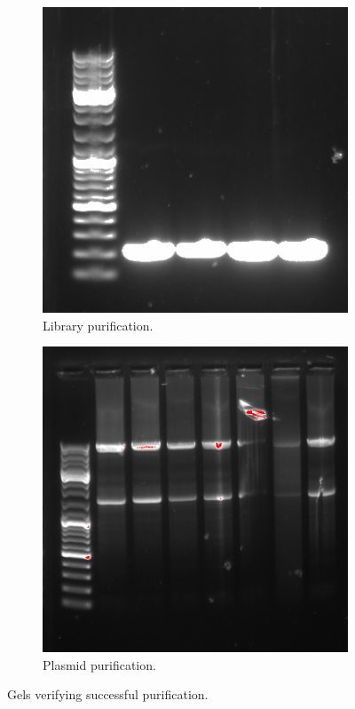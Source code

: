 \documentclass{article}
\begin{document}
\begin{multicols}{2}
	\begin{figure}[H]
		\centering
		\begin{subfigure}{0.7\linewidth}
			\includegraphics[width=\linewidth]{images/oligos_efter_PCR_renad.png}
			\caption{Library purification.}
		\end{subfigure}
		
		\begin{subfigure}{0.7\linewidth}
			\includegraphics[width=\linewidth]{images/pscz1_efter_PCR_renad.png}
			\caption{Plasmid purification.}
			\label{pscz1_efter_PCR_renad}
		\end{subfigure}
		\caption{Gels verifying successful purification.}
		\label{rening}
	\end{figure}


\end{multicols}
\end{document}
